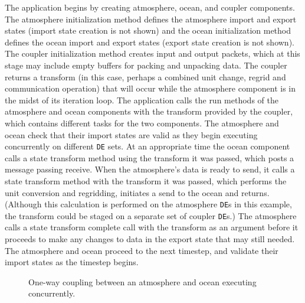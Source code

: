 The application begins by creating atmosphere, ocean, and coupler components.
The atmosphere initialization method defines the atmosphere import and export states
(import state creation is not shown) and the ocean initialization method defines
the ocean import and export states (export state creation is not shown).  The
coupler initialization method creates input and output packets, which at this
stage may include empty buffers for packing and unpacking data.  The coupler returns a
transform (in this case, perhaps a combined unit change, regrid and communication 
operation) that will occur while the atmosphere 
component is in the midst of its iteration loop.  The application calls the run methods
of the atmosphere and ocean components with the transform provided by the coupler,
which contains different tasks for the two components.  The atmosphere and ocean 
check that their import states are valid as they begin executing concurrently on
different {\tt DE} sets.  At an appropriate time the
ocean component calls a state transform method using the transform it was passed, 
which posts a message passing receive.  When the atmosphere's data is ready to send, 
it calls a state transform method with the transform it was passed, which performs
the unit conversion and regridding, initiates a send
to the ocean and returns.  (Although this calculation is performed on the atmosphere 
{\tt DE}s in this example, the transform could be staged on a separate set of coupler
{\tt DE}s.)  The atmosphere calls a state transform complete call with the transform
as an argument before it proceeds to make any changes to data in the export state
that may still needed.  The atmosphere and ocean proceed to the next 
timestep, and validate their import states as the timestep begins.  

\begin{figure}
\caption[{Coupling Sequence}]{One-way coupling between an atmosphere and
ocean executing concurrently.}
\label{fig:1waycoupling}
\end{figure}

